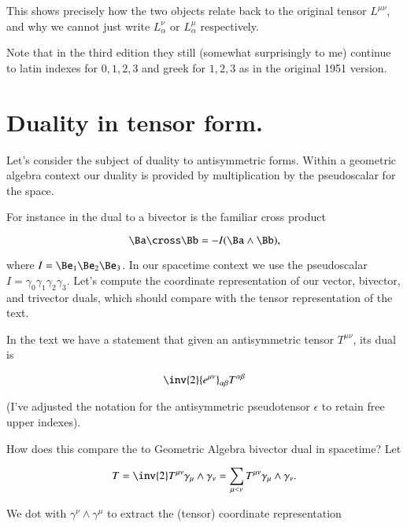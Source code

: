 This shows precisely how the two objects relate back to the original tensor $L^{\mu \nu}$, and why we cannot just write $L_\alpha^\nu$ or $L^\mu_\alpha$ respectively.

Note that in the third edition they still (somewhat surprisingly to me) continue to latin indexes for $0,1,2,3$ and greek for $1,2,3$ as in the original 1951 version.

\section{Duality in tensor form.}

Let's consider the subject of duality to antisymmetric forms.  Within a geometric algebra context our duality is provided by multiplication by the pseudoscalar for the space.

For instance in  the dual to a bivector is the familiar cross product

\begin{equation}\label{eqn:antisymmetricTensorTx:500}
\Ba \cross \Bb = -I (\Ba \wedge \Bb),
\end{equation}

where $I = \Be_1 \Be_2 \Be_3$.  In our spacetime context we use the pseudoscalar $I = \gamma_0 \gamma_1 \gamma_2 \gamma_3$.  Let's compute the coordinate representation of our vector, bivector, and trivector duals, which should compare with the tensor representation of the text.

In the text we have a statement that given an antisymmetric tensor $T^{\mu \nu}$, its dual is

\begin{equation}\label{eqn:antisymmetricTensorTx:510}
\inv{2} {e^{\mu \nu}}_{\alpha \beta} T^{\alpha \beta}
\end{equation}

(I've adjusted the notation for the antisymmetric pseudotensor $\epsilon$ to retain free upper indexes).

How does this compare the to Geometric Algebra bivector dual in spacetime?  Let

\begin{equation}\label{eqn:antisymmetricTensorTx:520}
T = \inv{2} T^{\mu \nu} \gamma_\mu \wedge \gamma_\nu 
= \sum_{\mu < \nu} T^{\mu \nu} \gamma_\mu \wedge \gamma_\nu.
\end{equation}

We dot with $\gamma^\nu \wedge \gamma^\mu$ to extract the (tensor) coordinate representation

